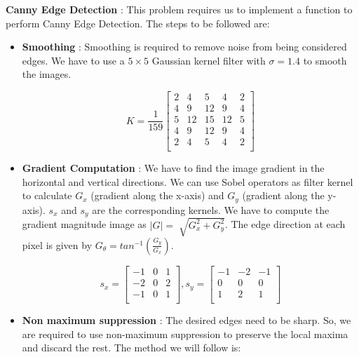 \documentclass{assignment}
\begin{document}
\begin{problemlist}
\begin{enumerate}[label*=\arabic*.]
\end{enumerate}

\pbitem \textbf{Canny Edge Detection} : This problem requires us to implement a function to perform Canny Edge Detection. The steps to be followed are:

\begin{itemize}

\item \textbf{Smoothing} : Smoothing is required to remove noise from being considered edges. We have to use a $5 \times 5$ Gaussian kernel filter with $\sigma = 1.4$ to smooth the images.

\begin{equation}
K = \frac{1}{159}\begin{bmatrix}
2 & 4 & 5 & 4 & 2 \\
4 & 9 & 12 & 9 & 4 \\
5 & 12 & 15 & 12 & 5 \\
4 & 9 & 12 & 9 & 4 \\
2 & 4 & 5 & 4 & 2 \\
\end{bmatrix}
\end{equation}

\item \textbf{Gradient Computation} : We have to find the image gradient in the horizontal and vertical directions. We can use Sobel operators as filter kernel to calculate $G_x$ (gradient along the x-axis) and $G_y$ (gradient along the y-axis). $s_x$ and $s_y$ are the corresponding kernels. We have to compute the gradient magnitude image as $|G| = \sqrt[]{G_x^2 + G_y^2}$. The edge direction at each pixel is given by $G_\theta = tan^{-1}(\frac{G_y}{G_x})$.

\begin{equation}
s_x = \begin{bmatrix}
-1 & 0 & 1 \\
-2 & 0 & 2 \\
-1 & 0 & 1 \\
\end{bmatrix},
s_y = \begin{bmatrix}
-1 & -2 & -1 \\
0 & 0 & 0 \\
1 & 2 & 1 \\
\end{bmatrix}
\end{equation}

\item \textbf{Non maximum suppression} : The desired edges need to be sharp. So, we are required to use non-maximum suppression to preserve the local maxima and discard the rest. The method we will follow is:


\end{itemize}
\end{problemlist}
\end{document}
